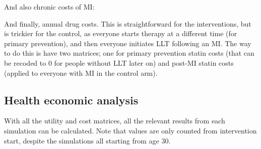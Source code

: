 \documentclass[11pt]{article}
\begin{document}
\color{Blue4}
\begin{stlog}\end{stlog}
\color{black}

And also chronic costs of MI:

\color{Blue4}
\begin{stlog}\end{stlog}
\begin{stlog}\end{stlog}
\color{black}

And finally, annual drug costs. 
This is straightforward for the interventions, but is trickier for the control, 
as everyone starts therapy at a different time (for primary prevention), and then 
everyone initiates LLT following an MI. 
The way to do this is have two matrices; one for primary prevention statin costs 
(that can be recoded to 0 for people without LLT later on) and post-MI statin costs 
(applied to everyone with MI in the control arm). 

\color{Blue4}
\begin{stlog}\end{stlog}
\begin{stlog}\end{stlog}
\begin{stlog}\end{stlog}
\begin{stlog}\end{stlog}
\begin{stlog}\end{stlog}
\begin{stlog}\end{stlog}
\color{black}

\subsection{Health economic analysis}

With all the utility and cost matrices, all the relevant results from each simulation
can be calculated. Note that values are only counted from intervention start, despite the simulations
all starting from age 30.

\color{Blue4}
\begin{stlog}\end{stlog}
\color{black}
\end{document}
